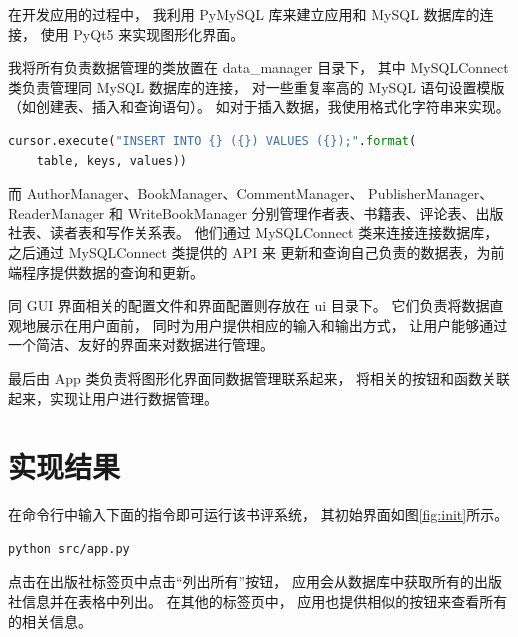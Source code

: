 \documentclass[12pt,onecolumn]{report}
\theoremstyle{plain}
\numberwithin{figure}{chapter}
\numberwithin{table}{chapter}
\numberwithin{lstlisting}{chapter}
\begin{document}
在开发应用的过程中，
我利用 PyMySQL 库来建立应用和 MySQL 数据库的连接，
使用 PyQt5 来实现图形化界面。

我将所有负责数据管理的类放置在 data\_manager 目录下，
其中 MySQLConnect 类负责管理同 MySQL 数据库的连接，
对一些重复率高的 MySQL 语句设置模版（如创建表、插入和查询语句）。
如对于插入数据，我使用格式化字符串来实现。
\begin{lstlisting}[language=python]
cursor.execute("INSERT INTO {} ({}) VALUES ({});".format(
    table, keys, values))
\end{lstlisting}

而 AuthorManager、BookManager、CommentManager、
PublisherManager、ReaderManager 和 WriteBookManager
分别管理作者表、书籍表、评论表、出版社表、读者表和写作关系表。
他们通过 MySQLConnect 类来连接连接数据库，
之后通过 MySQLConnect 类提供的 API 来
更新和查询自己负责的数据表，为前端程序提供数据的查询和更新。

同 GUI 界面相关的配置文件和界面配置则存放在 ui 目录下。
它们负责将数据直观地展示在用户面前，
同时为用户提供相应的输入和输出方式，
让用户能够通过一个简洁、友好的界面来对数据进行管理。

最后由 App 类负责将图形化界面同数据管理联系起来，
将相关的按钮和函数关联起来，实现让用户进行数据管理。

\section{实现结果}
在命令行中输入下面的指令即可运行该书评系统，
其初始界面如图\ref{fig:init}所示。
\begin{lstlisting}[language=bash]
python src/app.py
\end{lstlisting}

点击在出版社标签页中点击``列出所有''按钮，
应用会从数据库中获取所有的出版社信息并在表格中列出。
在其他的标签页中，
应用也提供相似的按钮来查看所有的相关信息。
\end{document}
